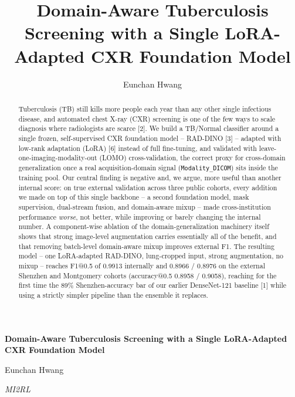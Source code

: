 \documentclass[runningheads]{llncs}
\begin{document}
\title{Domain-Aware Tuberculosis Screening with a Single LoRA-Adapted CXR Foundation Model}


\author{Eunchan Hwang}

{\LARGE\bfseries Domain-Aware Tuberculosis Screening with a Single LoRA-Adapted CXR Foundation Model\par}
\vspace{0.5em}
{\large Eunchan Hwang\par}
{\itshape MI2RL\par}
\vspace{1em}

\maketitle

\begin{abstract}
Tuberculosis (TB) still kills more people each year than any other single
infectious disease, and automated chest X-ray (CXR) screening is one of the
few ways to scale diagnosis where radiologists are scarce [2]. We
build a TB/Normal classifier around a single frozen, self-supervised CXR
foundation model -- RAD-DINO [3] -- adapted with low-rank
adaptation (LoRA) [6] instead of full fine-tuning, and validated
with leave-one-imaging-modality-out (LOMO) cross-validation, the correct
proxy for cross-domain generalization once a real acquisition-domain signal
(\texttt{Modality\_DICOM}) sits inside the training pool. Our central
finding is negative and, we argue, more useful than another internal
score: on true external validation across three public cohorts, every
addition we made on top of this single backbone -- a second foundation
model, mask supervision, dual-stream fusion, and domain-aware mixup -- made
cross-institution performance \emph{worse}, not better, while improving or
barely changing the internal number. A component-wise ablation of the
domain-generalization machinery itself shows that strong image-level
augmentation carries essentially all of the benefit, and that removing
batch-level domain-aware mixup improves external F1. The resulting model --
one LoRA-adapted RAD-DINO, lung-cropped input, strong augmentation, no
mixup -- reaches F1@0.5 of 0.9913 internally and 0.8966 / 0.8976 on the
external Shenzhen and Montgomery cohorts (accuracy@0.5 0.8958 / 0.9058),
reaching for the first time the 89\% Shenzhen-accuracy bar of our earlier
DenseNet-121 baseline [1] while using a strictly simpler pipeline
than the ensemble it replaces.
\end{abstract}
\end{document}
